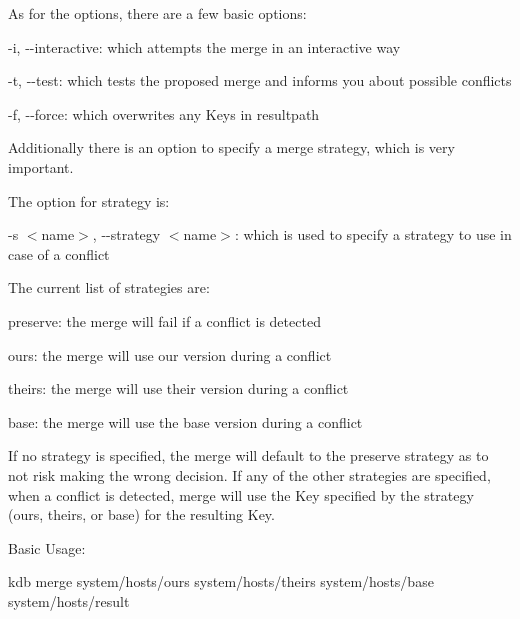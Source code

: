 As for the options, there are a few basic options\+:


\begin{DoxyItemize}
\item {\ttfamily -\/i}, {\ttfamily -\/-\/interactive}\+: which attempts the merge in an interactive way
\item {\ttfamily -\/t}, {\ttfamily -\/-\/test}\+: which tests the proposed merge and informs you about possible conflicts
\item {\ttfamily -\/f}, {\ttfamily -\/-\/force}\+: which overwrites any Keys in {\ttfamily resultpath}
\end{DoxyItemize}

Additionally there is an option to specify a merge strategy, which is very important.

The option for strategy is\+:


\begin{DoxyItemize}
\item {\ttfamily -\/s $<$name$>$}, {\ttfamily -\/-\/strategy $<$name$>$}\+: which is used to specify a strategy to use in case of a conflict
\end{DoxyItemize}

The current list of strategies are\+:


\begin{DoxyItemize}
\item {\ttfamily preserve}\+: the merge will fail if a conflict is detected
\item {\ttfamily ours}\+: the merge will use our version during a conflict
\item {\ttfamily theirs}\+: the merge will use their version during a conflict
\item {\ttfamily base}\+: the merge will use the base version during a conflict
\end{DoxyItemize}

If no strategy is specified, the merge will default to the preserve strategy as to not risk making the wrong decision. If any of the other strategies are specified, when a conflict is detected, merge will use the Key specified by the strategy ({\ttfamily ours}, {\ttfamily theirs}, or {\ttfamily base}) for the resulting Key.

Basic Usage\+:


\begin{DoxyCode}
kdb merge system/hosts/ours system/hosts/theirs system/hosts/base system/hosts/result
\end{DoxyCode}


